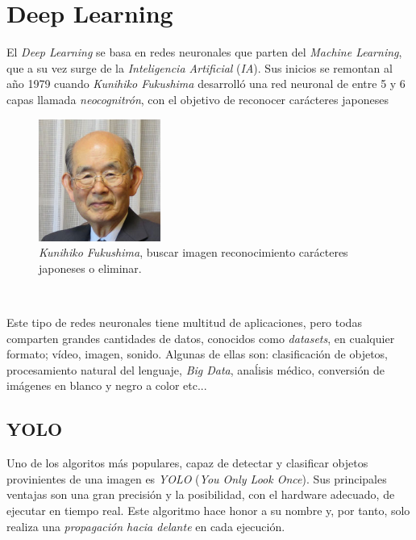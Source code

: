 \section{Deep Learning}
\label{sec:deeplearning}
El \textit{Deep Learning} se basa en redes neuronales que parten del \textit{Machine Learning}, que a su vez surge de la \textit{Inteligencia Artificial} (\textit{IA}). Sus inicios se remontan al año 1979 cuando \textit{Kunihiko Fukushima} desarrolló una red neuronal de entre 5 y 6 capas llamada \textit{neocognitrón}, con el objetivo de reconocer carácteres japoneses\\

\begin{figure} [h!]
	\begin{center}
		\includegraphics[width=4cm]{figs/kuni}
	\end{center}
	\caption{\textit{Kunihiko Fukushima}, buscar imagen reconocimiento carácteres japoneses o eliminar.}
	\label{fig:kuni}
\end{figure}\


Este tipo de redes neuronales tiene multitud de aplicaciones, pero todas comparten grandes cantidades de datos, conocidos como \textit{datasets}, en cualquier formato; vídeo, imagen, sonido. Algunas de ellas son: clasificación de objetos, procesamiento natural del lenguaje, \textit{Big Data}, anaĺisis médico, conversión de imágenes en blanco y negro a color etc...\\

\subsection{YOLO}
\label{sec:yolo}

Uno de los algoritos más populares, capaz de detectar y clasificar objetos provinientes de una imagen es \textit{YOLO} (\textit{You Only Look Once}). Sus principales ventajas son una gran precisión y la posibilidad, con el hardware adecuado, de ejecutar en tiempo real. Este algoritmo hace honor a su nombre y, por tanto, solo realiza una \textit{propagación hacia delante} en cada ejecución.\\

